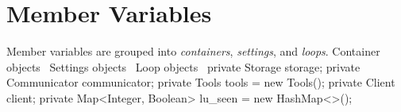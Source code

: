 \section{Member Variables}
Member variables are grouped into \emph{containers}, \emph{settings}, and
\emph{loops}.
\nwenddocs{}\endmoddef{}
\LA{}Container objects~{\nwtagstyle{}}\RA{}
\LA{}Settings objects~{\nwtagstyle{}}\RA{}
\LA{}Loop objects~{\nwtagstyle{}}\RA{}
\nwendcode{}\nwdocspar
{}
\nwenddocs{}\endmoddef{}
private Storage storage;
private Communicator communicator;
private Tools tools = new Tools();
private Client client;
private Map<Integer, Boolean> lu_seen = new HashMap<>();
\nwendcode{}\nwdocspar

